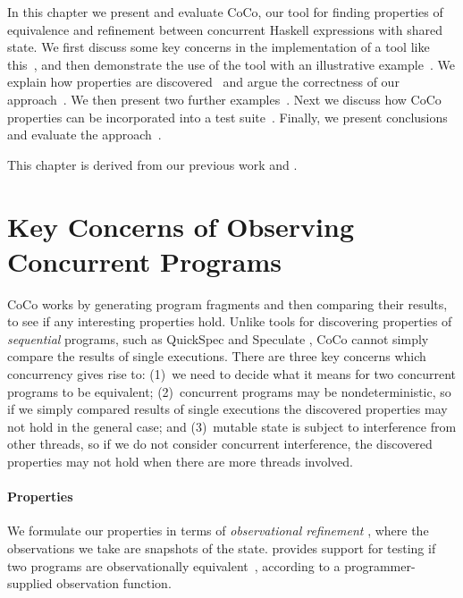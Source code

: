 In this chapter we present and evaluate CoCo, our tool for finding
properties of equivalence and refinement between concurrent Haskell
expressions with shared state.  We first discuss some key concerns in
the implementation of a tool like this~, and then
demonstrate the use of the tool with an illustrative
example~.  We explain how properties are
discovered~ and argue the correctness of our
approach~.  We then present two further
examples~.  Next we discuss how CoCo properties can
be incorporated into a \dejafu{} test suite~.
Finally, we present conclusions and evaluate the
approach~.

This chapter is derived from our previous work \cite{tfp-coco} and
\cite{walker2018}.

\section{Key Concerns of Observing Concurrent Programs}
\label{sec:coco-concerns}

CoCo works by generating program fragments and then comparing their
results, to see if any interesting properties hold.  Unlike tools for
discovering properties of \emph{sequential} programs, such as
QuickSpec \parencite{smallbone2017} and Speculate
\parencite{braquehais2017}, CoCo cannot simply compare the results of
single executions.  There are three key concerns which concurrency
gives rise to: (1)~we need to decide what it means for two concurrent
programs to be equivalent; (2)~concurrent programs may be
nondeterministic, so if we simply compared results of single
executions the discovered properties may not hold in the general case;
and (3)~mutable state is subject to interference from other threads,
so if we do not consider concurrent interference, the discovered
properties may not hold when there are more threads involved.

\paragraph{Properties}
We formulate our properties in terms of \emph{observational
  refinement} \parencite{he1986}, where the observations we take are
snapshots of the state.  \dejafu{} provides support for testing if two
programs are observationally equivalent~,
according to a programmer-supplied observation function.

